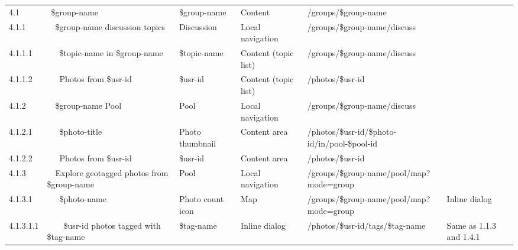 \documentclass[12pt,a4paper]{article}
\begin{document}
\begin{landscape}
\begin{table}[h!b!p!]
\begin{center}
\begin{tiny}
\begin{tabular}{l|l|l|l|l|p{3cm}}
              4.1 &
              ~\$group-name &
              \$group-name &
              Content &
              /groups/\$group-name &
              \\

                4.1.1 &
                ~~\$group-name discussion topics &
                Discussion &
                Local navigation &
                /groups/\$group-name/discuss &
                \\

                  4.1.1.1 &
                  ~~~\$topic-name in \$group-name &
                  \$topic-name &
                  Content (topic list) &
                  /groups/\$group-name/discuss &
                  \\

                  4.1.1.2 &
                  ~~~Photos from \$usr-id &
                  \$usr-id &
                  Content (topic list) &
                  /photos/\$usr-id &
                  \\

                4.1.2 &
                ~~\$group-name Pool &
                Pool &
                Local navigation &
                /groups/\$group-name/discuss &
                \\

                  4.1.2.1 &
                  ~~~\$photo-title &
                  Photo thumbnail &
                  Content area &
                  /photos/\$usr-id/\$photo-id/in/pool-\$pool-id &
                  \\

                  4.1.2.2 &
                  ~~~Photos from \$usr-id &
                  \$usr-id &
                  Content area &
                  /photos/\$usr-id &
                  \\

                4.1.3 &
                ~~Explore geotagged photos from \$group-name  &
                Pool &
                Local navigation &
                /groups/\$group-name/pool/map?mode=group &
                \\

                  4.1.3.1 &
                  ~~~\$photo-name &
                  Photo count icon &
                  Map &
                  /groups/\$group-name/pool/map?mode=group &
                  Inline dialog\\

                    4.1.3.1.1 &
                    ~~~~\$usr-id photos tagged with \$tag-name &
                    \$tag-name &
                    Inline dialog &
                    /photos/\$usr-id/tags/\$tag-name &
                    Same as 1.1.3 and 1.4.1\\


\end{tabular}
\end{tiny}
\end{center}
\end{table}
\end{landscape}
\end{document}
